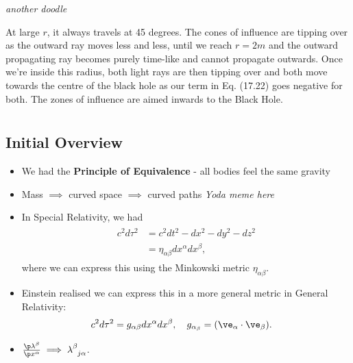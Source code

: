 \documentclass[a4paper, 11pt, normalem]{report}
\begin{document}
\emph{another doodle}
\begin{figure}[H]
    \centering
\end{figure}
At large $r$, it always travels at 45 degrees.
The cones of influence are tipping over as the outward ray moves less and less, until we reach $r=2m$ and the outward propagating ray becomes purely time-like and cannot propagate outwards.
Once we're inside this radius, both light rays are then tipping over and both move towards the centre of the black hole as our term in Eq. (17.22) goes negative for both.
The zones of influence are aimed inwards to the Black Hole.

\chapter{}
\section{Initial Overview}
\begin{itemize}
    \item We had the \textbf{Principle of Equivalence} - all bodies feel the same gravity
    \item Mass $\implies$ curved space $\implies$ curved paths \emph{Yoda meme here}
    \item In Special Relativity, we had
        \begin{align}
            \begin{split}
                c^2d\tau^2 &= c^2dt^2 - dx^2 - dy^2 - dz^2 \\
                           &= \eta_{\alpha\beta}dx^\alpha dx^\beta,
            \end{split}
        \end{align}
        where we can express this using the Minkowski metric $\eta_{\alpha\beta}$.
    \item Einstein realised we can express this in a more general metric in General Relativity:
        \begin{align}
            c^2d\tau^2 &= g_{\alpha\beta}dx^\alpha dx^\beta,\quad g_{\alpha_\beta} = (\ve_{\alpha}\cdot\ve_{\beta}).
        \end{align}
    \item $\frac{\p\lambda^\beta}{\p x^\alpha} \implies \tensor{\lambda}{^\beta_{j\alpha}}$.
\end{itemize}
\end{document}

